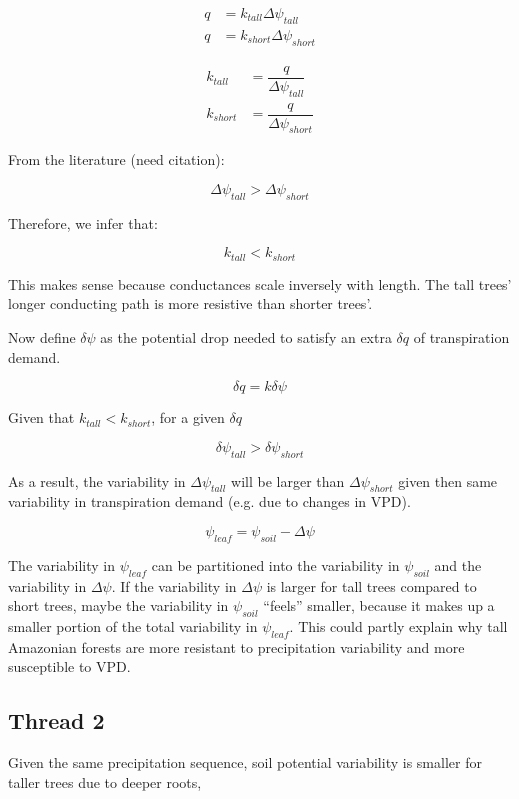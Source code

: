 \documentclass[11pt]{article}
\begin{document}
\begin{equation}
\begin{aligned}
q &= k_{tall}\Delta\psi_{tall}  \\
q &= k_{short}\Delta\psi_{short}
\end{aligned}
\end{equation}

\begin{equation}
\begin{aligned}
 k_{tall}    &= \dfrac{q}{\Delta\psi_{tall}}  \\
 k_{short} &= \dfrac{q}{\Delta\psi_{short}}
\end{aligned}
\end{equation}

From the literature (need citation):

\begin{equation}
\Delta\psi_{tall}>\Delta\psi_{short}
\end{equation}

Therefore, we infer that:

\begin{equation}
k_{tall}<k_{short}
\end{equation}

This makes sense because conductances scale inversely with length. 
The tall trees' longer conducting path is more resistive than shorter trees'.

Now define $\delta\psi$ as the potential drop needed to satisfy an extra $\delta q$ of transpiration demand.

\begin{equation}
\delta q = k \delta\psi
\end{equation}

Given that $k_{tall}<k_{short}$, for a given $\delta q$

\begin{equation}
\delta\psi_{tall} > \delta\psi_{short}
\end{equation}

As a result, the variability in $\Delta\psi_{tall}$ will be larger than $\Delta\psi_{short}$
given then same variability in transpiration demand (e.g. due to changes in VPD).

\begin{equation}
\psi_{leaf} = \psi_{soil} - \Delta\psi
\end{equation}

The variability in $\psi_{leaf}$ can be partitioned into the variability in $\psi_{soil}$ and the variability in $\Delta\psi$. 
If the variability in $\Delta\psi$ is larger for tall trees compared to short trees, maybe the variability in $\psi_{soil}$ ``feels'' smaller,
because it makes up a smaller portion of the total variability in $\psi_{leaf}$.
This could partly explain why tall Amazonian forests are more resistant to precipitation variability and more susceptible to VPD.

\subsection{Thread 2}
Given the same precipitation sequence, soil potential variability is smaller for taller trees due to deeper roots, 
\end{document}
